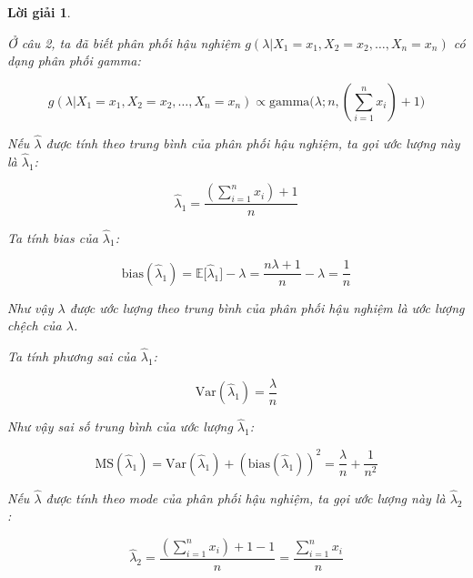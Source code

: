 \documentclass[14pt, a4paper]{article}
\theoremstyle{sltheorem}
\theoremstyle{soltheorem}
\newtheorem*{loigiai}{Lời giải}
\begin{document}
\begin{loigiai}
\begin{enumerate}
\begin{itemize}
            Ở câu 2, ta đã biết phân phối hậu nghiệm $g(\lambda \vert X_1 =x_1, X_2=x_2, \dots, X_n=x_n)$ có dạng phân phối gamma:

            \begin{equation*}
                g(\lambda \vert X_1 =x_1, X_2=x_2, \dots, X_n=x_n) \propto \text{gamma}\big(\lambda; n, (\sum_{i=1}^n x_i) + 1\big)
            \end{equation*}

            Nếu $\hat{\lambda}$ được tính theo trung bình của phân phối hậu nghiệm,
            ta gọi ước lượng này là $\hat{\lambda}_1$:

            \begin{equation*}
                \hat{\lambda}_1 = \dfrac{(\sum_{i=1}^n x_i) + 1}{n}
            \end{equation*}

            Ta tính bias của $\hat{\lambda}_1$:

            \begin{equation*}
                \text{bias}(\hat{\lambda}_1) = \mathbb{E} \lbrack \hat{\lambda}_1 \rbrack - \lambda = \dfrac{n\lambda + 1}{n} - \lambda = \dfrac{1}{n}
            \end{equation*}

            Như vậy $\lambda$ được ước lượng theo trung bình của phân phối hậu nghiệm là ước lượng chệch của $\lambda$.

            Ta tính phương sai của $\hat{\lambda}_1$:
            
            \begin{equation*}
                \text{Var}(\hat{\lambda}_1) = \dfrac{\lambda}{n}
            \end{equation*}

            Như vậy sai số trung bình của ước lượng $\hat{\lambda}_1$:

            \begin{equation*}
                \text{MS}(\hat{\lambda}_1) = \text{Var}(\hat{\lambda}_1) + (\text{bias}(\hat{\lambda}_1))^2 = \dfrac{\lambda}{n} + \dfrac{1}{n^2}
            \end{equation*}

            Nếu $\hat{\lambda}$ được tính theo mode của phân phối hậu nghiệm,
            ta gọi ước lượng này là $\hat{\lambda}_2$:

            \begin{equation*}
                \hat{\lambda}_2 = \dfrac{(\sum_{i=1}^n x_i) + 1 - 1}{n} = \dfrac{\sum_{i=1}^n x_i}{n}
            \end{equation*}


\end{itemize}
\end{enumerate}
\end{loigiai}
\end{document}
